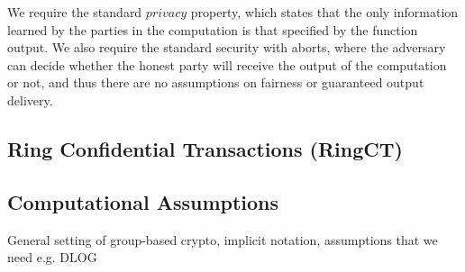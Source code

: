 We require the standard $privacy$ property, which states that the only information learned by the parties in the computation is that specified by the function output.
We also require the standard security with aborts, where the adversary can decide whether the honest party will receive the output of the computation or not, and thus there are no assumptions on fairness or guaranteed output delivery.

\subsection{Ring Confidential Transactions (RingCT)}

\subsection{Computational Assumptions}

\begin{todobox}
    General setting of group-based crypto, implicit notation, assumptions that we need e.g. DLOG 
\end{todobox}
\newpage
